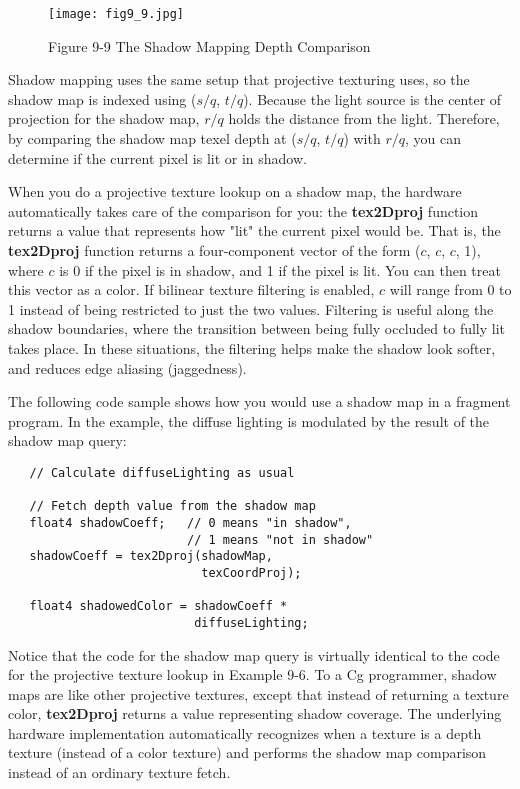 \documentclass[../main.tex]{subfiles}
\begin{document}
\begin{figure}
    \centering
    \texttt{[image: fig9\_9.jpg]}
    \caption{Figure 9-9 The Shadow Mapping Depth Comparison}
    \label{fig:9-9}
\end{figure}

Shadow mapping uses the same setup that projective texturing uses, so the shadow map is indexed using ($s/q$, $t/q$). Because the light source is the center of projection for the shadow map, $r/q$ holds the distance from the light. Therefore, by comparing the shadow map texel depth at ($s/q$, $t/q$) with $r/q$, you can determine if the current pixel is lit or in shadow.

When you do a projective texture lookup on a shadow map, the hardware automatically takes care of the comparison for you: the \textbf{tex2Dproj} function returns a value that represents how "lit" the current pixel would be. That is, the \textbf{tex2Dproj} function returns a four-component vector of the form ($c$, $c$, $c$, 1), where $c$ is 0 if the pixel is in shadow, and 1 if the pixel is lit. You can then treat this vector as a color. If bilinear texture filtering is enabled, $c$ will range from 0 to 1 instead of being restricted to just the two values. Filtering is useful along the shadow boundaries, where the transition between being fully occluded to fully lit takes place. In these situations, the filtering helps make the shadow look softer, and reduces edge aliasing (jaggedness).

The following code sample shows how you would use a shadow map in a fragment program. In the example, the diffuse lighting is modulated by the result of the shadow map query:

\FloatBarrier
\begin{lstlisting}
   // Calculate diffuseLighting as usual

   // Fetch depth value from the shadow map
   float4 shadowCoeff;   // 0 means "in shadow",
                         // 1 means "not in shadow"
   shadowCoeff = tex2Dproj(shadowMap,
                           texCoordProj);

   float4 shadowedColor = shadowCoeff *
                          diffuseLighting;
\end{lstlisting}
\FloatBarrier

Notice that the code for the shadow map query is virtually identical to the code for the projective texture lookup in Example 9-6. To a Cg programmer, shadow maps are like other projective textures, except that instead of returning a texture color, \textbf{tex2Dproj} returns a value representing shadow coverage. The underlying hardware implementation automatically recognizes when a texture is a depth texture (instead of a color texture) and performs the shadow map comparison instead of an ordinary texture fetch.
\end{document}

